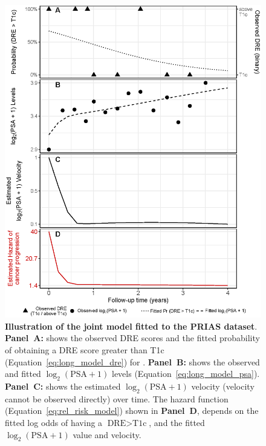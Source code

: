 \begin{figure}[!htb]
\captionsetup{justification=justified}
\centerline{\includegraphics[width=\columnwidth]{images/jmExplanationPlot_1757.eps}}
\caption{\textbf{Illustration of the joint model fitted to the PRIAS dataset}. \textbf{Panel~A:} shows the observed DRE scores and the fitted probability of obtaining a DRE score greater than T1c (Equation~\ref{eq:long_model_dre}) for . \textbf{Panel~B:} shows the observed and fitted $\log_2(\mbox{PSA} + 1)$ levels (Equation~\ref{eq:long_model_psa}). \textbf{Panel~C:} shows the estimated $\log_2(\mbox{PSA} + 1)$ velocity (velocity cannot be observed directly) over time. The hazard function (Equation~\ref{eq:rel_risk_model}) shown in \textbf{Panel~D}, depends on the fitted log odds of having a $\mbox{DRE} > \mbox{T1c}$, and the fitted $\log_2(\mbox{PSA} + 1)$ value and velocity.}
\label{fig:jmExplanationPlot_1757}
\end{figure}

